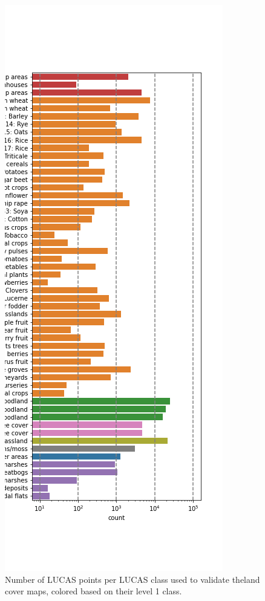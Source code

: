 \begin{figure}[h]
    \centering
    \includegraphics[width=\textwidth]{figs_05/fig_lucas_aoi_counts.png}
    \caption{Number of LUCAS points per LUCAS class used to validate theland cover maps, colored based on their level 1 class.}
    \label{fig:05_lucas_aoi_counts}
\end{figure}
